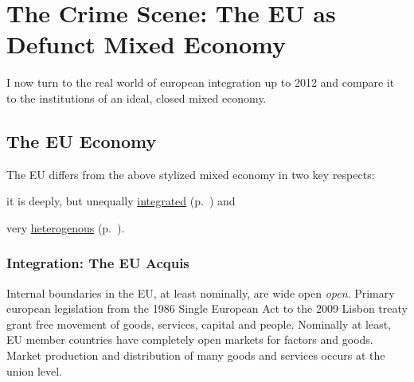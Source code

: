 

\section{The Crime Scene: The EU as Defunct Mixed Economy} \label{sec:EU-reality}
I now turn to the real world of european integration up to 2012 and compare it to the institutions of an ideal, closed mixed economy.

	\subsection{The EU Economy}
The \gls{EU} differs from the above stylized mixed economy in two key respects:
\begin{inparaenum}[1)]
	\item it is deeply, but unequally \hyperref[sec:EU-Acquis]{integrated} (p.~\pageref{sec:EU-Acquis}) and
	\item very \hyperref[sec:sources-of-wealth]{heterogenous} (p.~\pageref{sec:sources-of-wealth}).
\end{inparaenum}

\subsubsection[Integration]{Integration: The EU Acquis} \label{sec:EU-Acquis}
Internal boundaries in the \gls{EU}, at least nominally, are wide open \emph{open}. %
Primary european legislation from the 1986 Single European Act to the 2009 Lisbon treaty grant free movement of goods, services, capital and people. Nominally at least, \gls{EU} member countries have completely open markets for factors and goods. Market production and distribution of many goods and services occurs at the union level.

